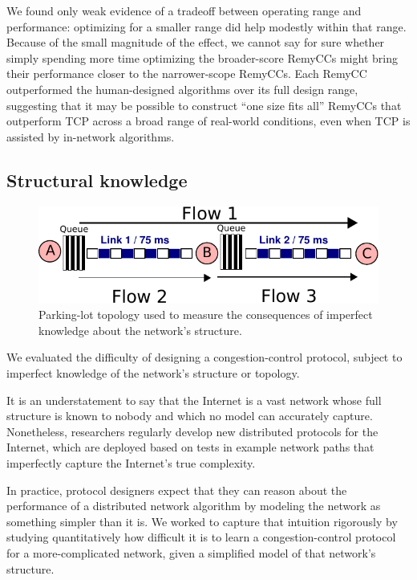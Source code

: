 We found only weak evidence of a tradeoff between operating range and
performance: optimizing for a smaller range did help modestly within
that range. Because of the small magnitude of the effect, we cannot
say for sure whether simply spending more time optimizing the
broader-score RemyCCs might bring their performance closer to the
narrower-scope RemyCCs. Each RemyCC outperformed the human-designed
algorithms over its full design range, suggesting that it may be
possible to construct ``one size fits all'' RemyCCs that outperform
TCP across a broad range of real-world conditions, even when TCP is
assisted by in-network algorithms.

\subsection{Structural knowledge}
\label{ss:topological}

\begin{figure}
\caption{Parking-lot topology used to measure the consequences of imperfect
knowledge about the network's structure.}
\label{fig:two-link}
\begin{center}
\includegraphics[width=\columnwidth]{twolink.pdf}
\end{center}
\end{figure}

We evaluated the difficulty of designing a congestion-control
protocol, subject to imperfect knowledge of the network's structure or
topology.

It is an understatement to say that the Internet is a vast network
whose full structure is known to nobody and which no model can
accurately capture. Nonetheless, researchers regularly develop new
distributed protocols for the Internet, which are deployed based on
tests in example network paths that imperfectly capture the Internet's
true complexity.

In practice, protocol designers expect that they can reason about the
performance of a distributed network algorithm by modeling the network
as something simpler than it is. We worked to capture that intuition
rigorously by studying quantitatively how difficult it is to learn a
congestion-control protocol for a more-complicated network, given a
simplified model of that network's structure.

